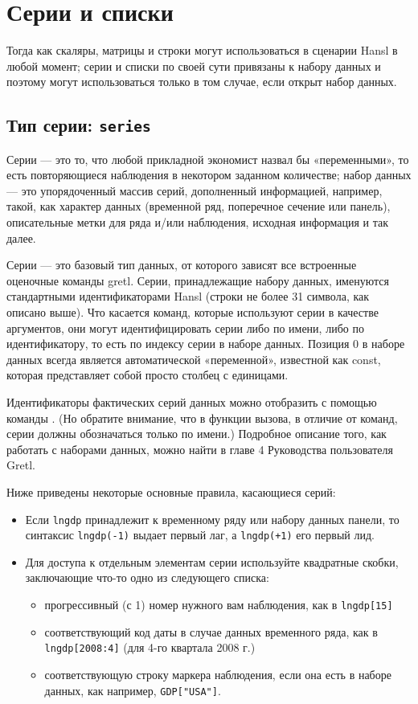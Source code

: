 \chapter{Серии и списки}
\label{chap:series-etc}

Тогда как скаляры, матрицы и строки могут использоваться в сценарии
Hansl в любой момент; серии и списки по своей сути привязаны к набору
данных и поэтому могут использоваться только в том случае, если открыт
набор данных.

\section{Тип серии: \texttt{series}}
\label{sec:series}

Серии --- это то, что любой прикладной экономист назвал бы
«переменными», то есть повторяющиеся наблюдения в некотором заданном
количестве; набор данных --- это упорядоченный массив серий,
дополненный информацией, например, такой, как характер данных
(временной ряд, поперечное сечение или панель), описательные метки для
ряда и/или наблюдения, исходная информация и так далее.

Серии --- это базовый тип данных, от которого зависят все встроенные
оценочные команды gretl.  Серии, принадлежащие набору данных,
именуются стандартными идентификаторами Hansl (строки не более 31
символа, как описано выше). Что касается команд, которые используют
серии в качестве аргументов, они могут идентифицировать серии либо по
имени, либо по идентификатору, то есть по индексу серии в наборе
данных. Позиция 0 в наборе данных всегда является автоматической
«переменной», известной как const, которая представляет собой просто
столбец с единицами.

Идентификаторы фактических серий данных можно отобразить с помощью
команды . (Но обратите внимание, что в функции вызова, в
отличие от команд, серии должны обозначаться только по имени.)
Подробное описание того, как работать с наборами данных, можно найти в
главе 4 Руководства пользователя Gretl.

Ниже приведены некоторые основные правила, касающиеся серий:

\begin{itemize}
\item Если \texttt{lngdp} принадлежит к временному ряду или набору
  данных панели, то синтаксис \texttt{lngdp(-1)} выдает первый лаг, а
  \texttt{lngdp(+1)} его первый лид.
\item Для доступа к отдельным элементам серии используйте квадратные
  скобки, заключающие что-то одно из следующего списка:
  \begin{itemize}
  \item прогрессивный (с 1) номер нужного вам наблюдения, как в
    \verb|lngdp[15]|
  \item соответствующий код даты в случае данных временного ряда, как
    в \verb|lngdp[2008:4]| (для 4-го квартала 2008 г.)
  \item соответствующую строку маркера наблюдения, если она есть в
    наборе данных, как например, \verb|GDP["USA"]|.
  \end{itemize}
\end{itemize}

